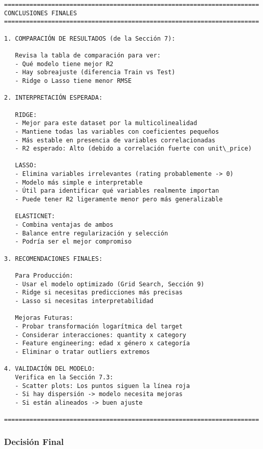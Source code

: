 \documentclass[11pt]{article}
\begin{document}
    \begin{Verbatim}[commandchars=\\\{\}]
======================================================================
CONCLUSIONES FINALES
======================================================================

1. COMPARACIÓN DE RESULTADOS (de la Sección 7):

   Revisa la tabla de comparación para ver:
   - Qué modelo tiene mejor R2
   - Hay sobreajuste (diferencia Train vs Test)
   - Ridge o Lasso tiene menor RMSE

2. INTERPRETACIÓN ESPERADA:

   RIDGE:
   - Mejor para este dataset por la multicolinealidad
   - Mantiene todas las variables con coeficientes pequeños
   - Más estable en presencia de variables correlacionadas
   - R2 esperado: Alto (debido a correlación fuerte con unit\_price)

   LASSO:
   - Elimina variables irrelevantes (rating probablemente -> 0)
   - Modelo más simple e interpretable
   - Útil para identificar qué variables realmente importan
   - Puede tener R2 ligeramente menor pero más generalizable

   ELASTICNET:
   - Combina ventajas de ambos
   - Balance entre regularización y selección
   - Podría ser el mejor compromiso

3. RECOMENDACIONES FINALES:

   Para Producción:
   - Usar el modelo optimizado (Grid Search, Sección 9)
   - Ridge si necesitas predicciones más precisas
   - Lasso si necesitas interpretabilidad

   Mejoras Futuras:
   - Probar transformación logarítmica del target
   - Considerar interacciones: quantity x category
   - Feature engineering: edad x género x categoría
   - Eliminar o tratar outliers extremos

4. VALIDACIÓN DEL MODELO:
   Verifica en la Sección 7.3:
   - Scatter plots: Los puntos siguen la línea roja
   - Si hay dispersión -> modelo necesita mejoras
   - Si están alineados -> buen ajuste

======================================================================
    \end{Verbatim}

    \subsubsection{Decisión Final}\label{decisiuxf3n-final}
\end{document}
